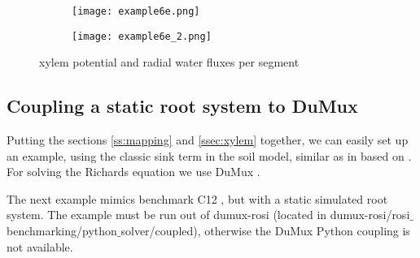 \begin{figure}
\begin{subfigure}[c]{0.5\textwidth}
\texttt{[image: example6e.png]}
 \label{fig:stomata}
\end{subfigure}
\begin{subfigure}[c]{0.5\textwidth}
\texttt{[image: example6e\_2.png]}
 \label{fig:stomatb}
\end{subfigure}
\caption{xylem potential and radial water fluxes per segment} 
\end{figure}

\subsection{Coupling a static root system to DuMux} \label{sec:dumux_coupling}

Putting the sections \ref{ss:mapping} and \ref{ssec:xylem} together, we can easily set up an example, using the classic sink term in the soil model, similar as in \citep{leitner2014impact} based on \citep{doussan1998modelling}. For solving the Richards equation we use DuMux \citep{koch2020dumux}.

The next example mimics benchmark C12 \citep{schnepf2019call}, but with a static simulated root system. The example must be run out of dumux-rosi (located in dumux-rosi/rosi$\_$benchmarking/python$\_$solver/coupled), otherwise the DuMux Python coupling is not available. 



